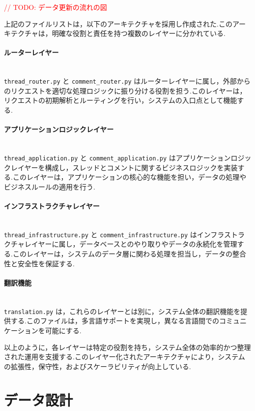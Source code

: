 \documentclass[b5paper,12pt,dvipdfmx]{jsreport}
\newcommand{\red}[1]{\textcolor{red}{#1}}
\begin{document}
\red{// TODO: データ更新の流れの図}

上記のファイルリストは，以下のアーキテクチャを採用し作成された.このアーキテクチャは，明確な役割と責任を持つ複数のレイヤーに分かれている.

\paragraph{ルーターレイヤー}\mbox{}\\
\texttt{thread\_router.py} と \texttt{comment\_router.py} はルーターレイヤーに属し，外部からのリクエストを適切な処理ロジックに振り分ける役割を担う.このレイヤーは，リクエストの初期解析とルーティングを行い，システムの入口点として機能する.

\paragraph{アプリケーションロジックレイヤー}\mbox{}\\
\texttt{thread\_application.py} と \texttt{comment\_application.py} はアプリケーションロジックレイヤーを構成し，スレッドとコメントに関するビジネスロジックを実装する.このレイヤーは，アプリケーションの核心的な機能を担い，データの処理やビジネスルールの適用を行う.

\paragraph{インフラストラクチャレイヤー}\mbox{}\\
\texttt{thread\_infrastructure.py} と \texttt{comment\_infrastructure.py} はインフラストラクチャレイヤーに属し，データベースとのやり取りやデータの永続化を管理する.このレイヤーは，システムのデータ層に関わる処理を担当し，データの整合性と安全性を保証する.

\paragraph{翻訳機能}\mbox{}\\
\texttt{translation.py} は，これらのレイヤーとは別に，システム全体の翻訳機能を提供する.このファイルは，多言語サポートを実現し，異なる言語間でのコミュニケーションを可能にする.

以上のように，各レイヤーは特定の役割を持ち，システム全体の効率的かつ整理された運用を支援する.このレイヤー化されたアーキテクチャにより，システムの拡張性，保守性，およびスケーラビリティが向上している.


\section{データ設計}
\end{document}

